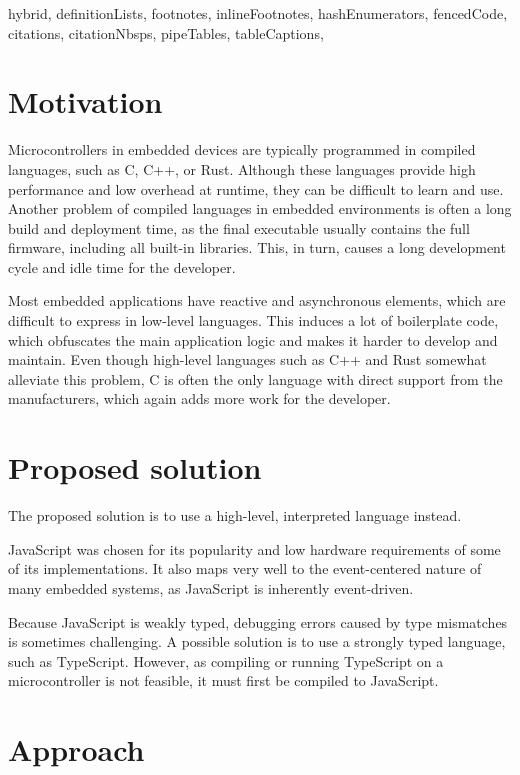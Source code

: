 \documentclass[
  digital,
  oneside,
  nosansbold,
  nocolorbold,
  lof,
  lot
]{fithesis4}
\begin{document}
\begin{markdown*}{%
  hybrid,
  definitionLists,
  footnotes,
  inlineFootnotes,
  hashEnumerators,
  fencedCode,
  citations,
  citationNbsps,
  pipeTables,
  tableCaptions,
}

\chapter{Motivation}

Microcontrollers in embedded devices are typically programmed in compiled languages, such as C, C++, or Rust. Although these languages provide high performance and low overhead at runtime, they can be difficult to learn and use. Another problem of compiled languages in embedded environments is often a long build and deployment time, as the final executable usually contains the full firmware, including all built-in libraries. This, in turn, causes a long development cycle and idle time for the developer.

Most embedded applications have reactive and asynchronous elements, which are difficult to express in low-level languages. This induces a lot of boilerplate code, which obfuscates the main application logic and makes it harder to develop and maintain. Even though high-level languages such as C++ and Rust somewhat alleviate this problem, C is often the only language with direct support from the manufacturers, which again adds more work for the developer.

\chapter{Proposed solution}

The proposed solution is to use a high-level, interpreted language instead.

JavaScript was chosen for its popularity and low hardware requirements of some of its implementations. It also maps very well to the event-centered nature of many embedded systems, as JavaScript is inherently event-driven.

Because JavaScript is weakly typed, debugging errors caused by type mismatches is sometimes challenging. A possible solution is to use a strongly typed language, such as TypeScript. However, as compiling or running TypeScript on a microcontroller is not feasible, it must first be compiled to JavaScript.


\chapter{Approach}


\end{markdown*}
\end{document}
